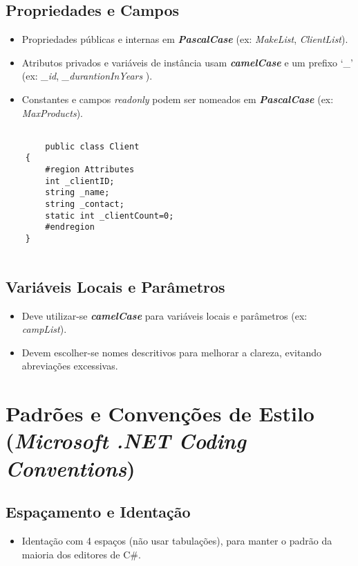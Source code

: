 \documentclass[11pt]{scrartcl} %
\begin{document}
\subsection{Propriedades e Campos}
\begin{itemize}
	\item Propriedades públicas e internas em \textbf{\textit{PascalCase}} (ex: \textit{MakeList}, \textit{ClientList}).
	\item Atributos privados e variáveis de instância usam \textbf{\textit{camelCase}} e um prefixo ‘\_’ (ex: \textit{\_id}, \textit{\_durantionInYears} ).
	\item Constantes e campos \textit{readonly} podem ser nomeados em \textbf{\textit{PascalCase}} (ex: \textit{MaxProducts}).
\end{itemize}

\begin{lstlisting}[language={[Sharp]C}, caption={A Classe Cliente}, label={Classe Cliente}]
	
		public class Client
	{
		#region Attributes
		int _clientID;
		string _name;
		string _contact;
		static int _clientCount=0;
		#endregion
	}
	
\end{lstlisting}

\subsection{Variáveis Locais e Parâmetros}
\begin{itemize}
	\item Deve utilizar-se \textbf{\textit{camelCase}} para variáveis locais e parâmetros (ex: \textit{campList}).
	\item Devem escolher-se nomes descritivos para melhorar a clareza, evitando abreviações excessivas.
\end{itemize}


\newpage

\section{Padrões e Convenções de Estilo (\textit{Microsoft .NET Coding Conventions})}

\subsection{Espaçamento e Identação}
\begin{itemize}
	\item Identação com 4 espaços (não usar tabulações), para manter o padrão da maioria dos editores de C\#.
\end{itemize}
\end{document}
